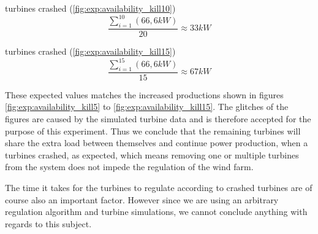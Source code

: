  turbines crashed (\cref{fig:exp:availability_kill10}) $$\frac{\sum\limits_{i=1}^{10}(66,6kW)}{20}\approx33kW$$

 turbines crashed (\cref{fig:exp:availability_kill15}) $$\frac{\sum\limits_{i=1}^{15}(66,6kW)}{15}\approx67kW$$

These expected values matches the increased productions shown in figures \ref{fig:exp:availability_kill5} to \ref{fig:exp:availability_kill15}. The glitches of the figures are caused by the simulated turbine data and is therefore accepted for the purpose of this experiment. Thus we conclude that the remaining turbines will share the extra load between themselves and continue power production, when a turbines crashed, as expected, which means removing one or multiple turbines from the system does not impede the regulation of the wind farm.

%
%

The time it takes for the turbines to regulate according to crashed turbines are of course also an important factor. However since we are using an arbitrary regulation algorithm and turbine simulations, we cannot conclude anything with regards to this subject.

